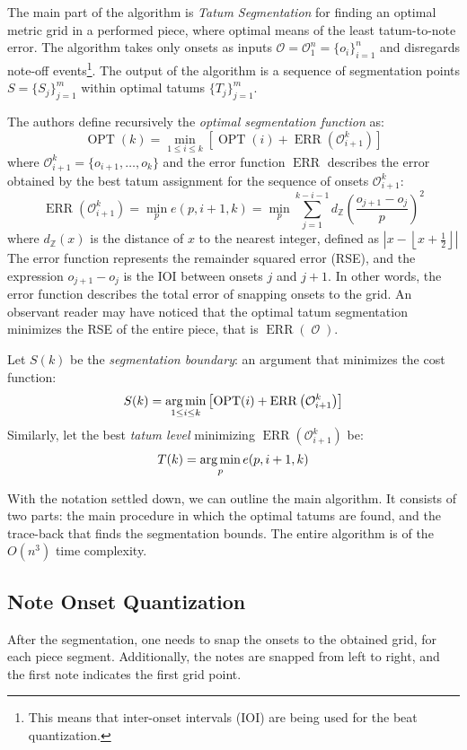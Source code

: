 The main part of the algorithm is \emph{Tatum Segmentation} for finding an optimal metric grid in a performed piece, where optimal means of the least tatum-to-note error. The algorithm takes only onsets as inputs $\mathcal{O}=\mathcal{O}_1^n=\{o_i\}_{i=1}^n$ and disregards note-off events\footnote{This means that inter-onset intervals (IOI) are being used for the beat quantization.}. The output of the algorithm is a sequence of segmentation points $S=\{S_j\}_{j=1}^m$ within optimal tatums $\{T_j\}_{j=1}^m$.

The authors define recursively the \emph{optimal segmentation function} as: $$\operatorname{OPT}(k) = \min_{1\leq i \leq k}\left[\operatorname{OPT}(i) + \operatorname{ERR}\left(\mathcal{O}_{i+1}^k\right)\right]$$ where $\mathcal{O}_{i+1}^k=\{o_{i+1},\ldots,o_k\}$ and the error function $\operatorname{ERR}$ describes the error obtained by the best tatum assignment for the sequence of onsets $\mathcal{O}_{i+1}^k$: $$\operatorname{ERR}\left(\mathcal{O}_{i+1}^k\right)=\min_p e\left(p,i+1,k\right)=\min_p \sum_{j=1}^{k-i-1}d_{\mathbb{Z}}\left(\frac{o_{j+1}-o_j}{p}\right)^2$$ where $d_{\mathbb{Z}}(x)$ is the distance of $x$ to the nearest integer, defined as $\left|x - \left\lfloor x + \tfrac{1}{2}\right\rfloor\right|$ The error function represents the remainder squared error (RSE), and the expression $o_{j+1}-o_j$ is the IOI between onsets $j$ and $j+1$. In other words, the error function describes the total error of snapping onsets to the grid. An observant reader may have noticed that the optimal tatum segmentation minimizes the RSE of the entire piece, that is $\operatorname{ERR}\left(\operatorname{\mathcal{O}}\right)$. 

Let $S(k)$ be the \emph{segmentation boundary}: an argument that minimizes the cost function: $$S(k)=\argmin_{1\leq i \leq k}\left[\operatorname{OPT}(i) + \operatorname{ERR}\left(\mathcal{O}_{i+1}^k\right)\right]$$ Similarly, let the best \emph{tatum level} minimizing $\operatorname{ERR}\left(\mathcal{O}_{i+1}^k\right)$ be: $$T(k)=\argmin_{p} e(p,i+1,k)$$ 

With the notation settled down, we can outline the main algorithm. It consists of two parts: the main procedure in which the optimal tatums are found, and the trace-back that finds the segmentation bounds. The entire algorithm is of the $O\left(n^3\right)$ time complexity.



\subsection{Note Onset Quantization}

After the segmentation, one needs to snap the onsets to the obtained grid, for each piece segment. Additionally, the notes are snapped from left to right, and the first note indicates the first grid point. 
